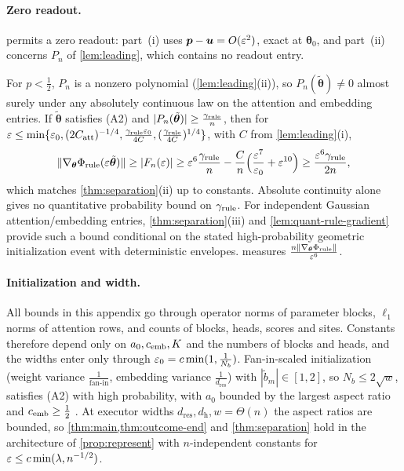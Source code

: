 \paragraph{Zero readout.}\label{rem:zero-readout}  permits a zero readout: part~(i) uses $\bm p-\bm u=O(\varepsilon^2)$, exact at $\bm\theta_0$, and part~(ii) concerns $P_n$ of
\cref{lem:leading}, which contains no readout entry.


\begin{remark}
\label{rem:generic-rule}
For $p<\frac{1}{2}$, $P_n$ is a nonzero polynomial (\cref{lem:leading}(ii)), so $P_n(\tilde{\bm\theta})\ne0$ almost surely under any absolutely continuous law on
the attention and embedding entries. If $\tilde{\bm\theta}$ satisfies (A2) and $|P_n(\tilde{\bm\theta})|\ge\frac{\gamma_{\mathrm{rule}}}{n}$, then for
$\varepsilon\le\min\{\varepsilon_0,(2C_{\mathrm{att}})^{-1/4},\frac{\gamma_{\mathrm{rule}}\varepsilon_0}{4C},(\frac{\gamma_{\mathrm{rule}}}{4C})^{1/4}\}$, with $C$ from \cref{lem:leading}(i),
\[
 \|\nabla_{\bm\theta}\Phi_{\mathrm{rule}}(\varepsilon\tilde{\bm\theta})\|\ge|F_n(\varepsilon)|\ge\varepsilon^6\frac{\gamma_{\mathrm{rule}}}{n}-\frac{C}{n}\Bigl(\frac{\varepsilon^7}{\varepsilon_0}+\varepsilon^{10}\Bigr)\ge\frac{\varepsilon^6\gamma_{\mathrm{rule}}}{2n},
\]
which matches \cref{thm:separation}(ii) up to constants. Absolute continuity alone
gives no quantitative probability bound on $\gamma_{\mathrm{rule}}$. For independent Gaussian
attention/embedding entries, \cref{thm:separation}(iii) and
\cref{lem:quant-rule-gradient} provide such a bound conditional on the stated
high-probability geometric initialization event with deterministic envelopes.  measures $\frac{n\|\nabla_{\bm\theta}\Phi_{\mathrm{rule}}\|}{\varepsilon^6}$.
\end{remark}

\paragraph{Initialization and width.}
\label{rem:end-width}
All bounds in this appendix go through operator norms of parameter blocks, $\ell_1$ norms of attention rows, and counts of blocks,
heads, scores and sites. Constants therefore depend only on $a_0,c_{\mathrm{emb}},K$ and the numbers of blocks and heads, and the widths enter only
through $\varepsilon_0=c\min(1,\frac{1}{N_b})$. Fan-in-scaled initialization (weight variance $\frac{1}{\text{fan-in}}$, embedding variance $\frac{1}{d_{\mathrm{res}}}$) with
$|\tilde b_m|\in[1,2]$, so $N_b\le2\sqrt w$, satisfies (A2) with high probability, with $a_0$ bounded by the largest aspect ratio and $c_{\mathrm{emb}}\ge\frac{1}{2}$
\citep[Thms.~4.4.5, 4.6.1]{vershynin2018high}. At executor widths $d_{\mathrm{res}},d_{\mathrm h},w=\Theta(n)$ the aspect ratios are bounded, so
\cref{thm:main,thm:outcome-end} and \cref{thm:separation} hold in the architecture of \cref{prop:represent} with $n$-independent constants for
$\varepsilon\le c\min(\lambda,n^{-1/2})$.


